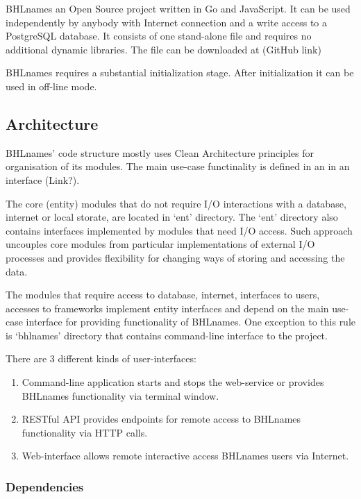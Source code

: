 \documentclass[
]{article}
\begin{document}
BHLnames an Open Source project written in Go and JavaScript. It can be
used independently by anybody with Internet connection and a write
access to a PostgreSQL database. It consists of one stand-alone file and
requires no additional dynamic libraries. The file can be downloaded at
(GitHub link)

BHLnames requires a substantial initialization stage. After
initialization it can be used in off-line mode.

\hypertarget{architecture}{%
\subsection{Architecture}\label{architecture}}

BHLnames' code structure mostly uses Clean Architecture principles for
organisation of its modules. The main use-case functinality is defined
in an in an interface (Link?).

The core (entity) modules that do not require I/O interactions with a
database, internet or local storate, are located in `ent' directory. The
`ent' directory also contains interfaces implemented by modules that
need I/O access. Such approach uncouples core modules from particular
implementations of external I/O processes and provides flexibility for
changing ways of storing and accessing the data.

The modules that require access to database, internet, interfaces to
users, accesses to frameworks implement entity interfaces and depend on
the main use-case interface for providing functionality of BHLnames. One
exception to this rule is `bhlnames' directory that contains
command-line interface to the project.

There are 3 different kinds of user-interfaces:

\begin{enumerate}
\def\labelenumi{\arabic{enumi}.}
\item
  Command-line application starts and stops the web-service or provides
  BHLnames functionality via terminal window.
\item
  RESTful API provides endpoints for remote access to BHLnames
  functionality via HTTP calls.
\item
  Web-interface allows remote interactive access BHLnames users via
  Internet.
\end{enumerate}

\hypertarget{dependencies}{%
\subsubsection{Dependencies}\label{dependencies}}
\end{document}
